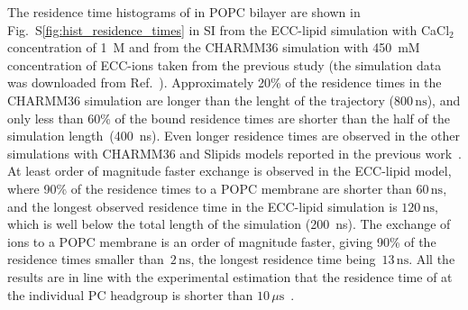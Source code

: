 \documentclass[aip,jcp,twocolumn]{revtex4}
\begin{document}
The residence time histograms of 
in POPC bilayer are shown in Fig.~S\ref{fig:hist_residence_times} in SI 
from the ECC-lipid simulation with CaCl$_2$ concentration of 1~M
and from the CHARMM36 simulation with 450~mM concentration of
ECC-ions taken from the previous study \cite{javanainen17}
(the simulation data was downloaded from Ref.~).
Approximately 20\% of the  residence times in the CHARMM36 simulation are longer than
the lenght of the trajectory ($800\,\mathrm{ns}$),
and only less than 60\% of the bound residence times are shorter than the half
of the simulation length~(400~ns).
Even longer residence times are observed
in the other simulations with CHARMM36 and Slipids models reported in the previous work~\cite{javanainen17}.
At least order of magnitude faster exchange is observed in the
ECC-lipid model, where 90\% of the  residence times to a POPC membrane are 
shorter than $60\,\mathrm{ns}$, %
and the longest observed residence time in the ECC-lipid simulation is $120\,\mathrm{ns}$, 
which is well below the total length of the simulation (200~ns).
The exchange of  ions to a POPC membrane is
an order of magnitude faster, giving 90\%
of the residence times smaller than~$2\,\mathrm{ns}$,
the longest residence time being~$13\,\mathrm{ns}$. 
All the results are in line with the experimental estimation that 
the residence time of  at the individual PC headgroup 
is shorter than $10\,\mu\mathrm{s}$~\cite{altenbach84}.


\end{document}
